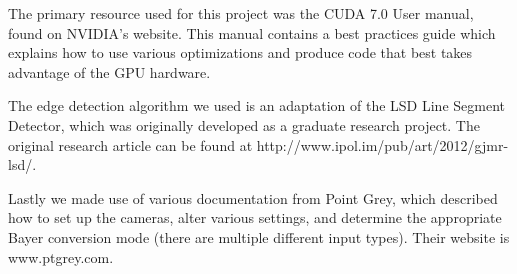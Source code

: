 The primary resource used for this project was the CUDA 7.0 User manual, found on NVIDIA's website. This manual contains a best practices guide which explains how to use various optimizations and produce code that best takes advantage of the GPU hardware. 
\par
The edge detection algorithm we used is an adaptation of the LSD Line Segment Detector, which was originally developed as a graduate research project. The original research article can be found at http://www.ipol.im/pub/art/2012/gjmr-lsd/.
\par
Lastly we made use of various documentation from Point Grey, which described how to set up the cameras, alter various settings, and determine the appropriate Bayer conversion mode (there are multiple different input types). Their website is www.ptgrey.com.\\
